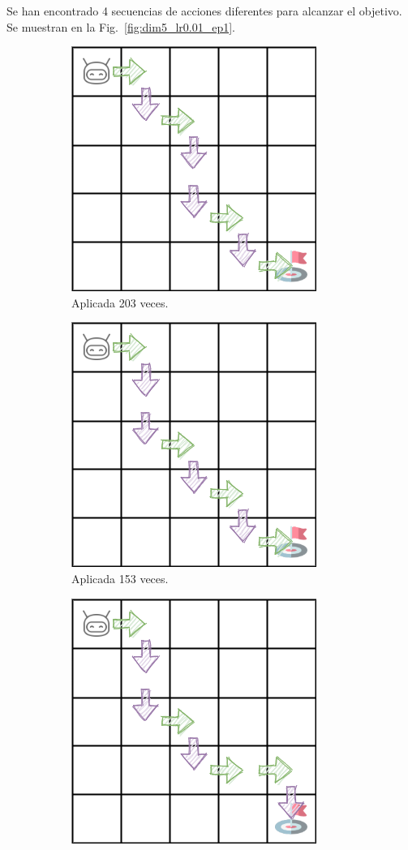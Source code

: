 Se han encontrado 4 secuencias de acciones diferentes para alcanzar el objetivo. Se muestran en la Fig.~\ref{fig:dim5_lr0.01_ep1}.

\begin{figure}
    \centering
    \begin{subfigure}{.5\textwidth}
        \centering
        \includegraphics[scale=0.4]{cap5_experimentacion/images/dim5_lr0.01_ep1_203.png}
        \caption{Aplicada 203 veces.}
        \label{fig:dim5_lr0.01_ep1_203}
    \end{subfigure}%
    \begin{subfigure}{.5\textwidth}
        \centering
        \includegraphics[scale=0.4]{cap5_experimentacion/images/dim5_lr0.01_ep1_153.png}
        \caption{Aplicada 153 veces.}
        \label{fig:dim5_lr0.01_ep1_153}
    \end{subfigure}
    \begin{subfigure}{.5\textwidth}
        \centering
        \includegraphics[scale=0.4]{cap5_experimentacion/images/dim5_lr0.01_ep1_51.png}

\end{subfigure}
\end{figure}

